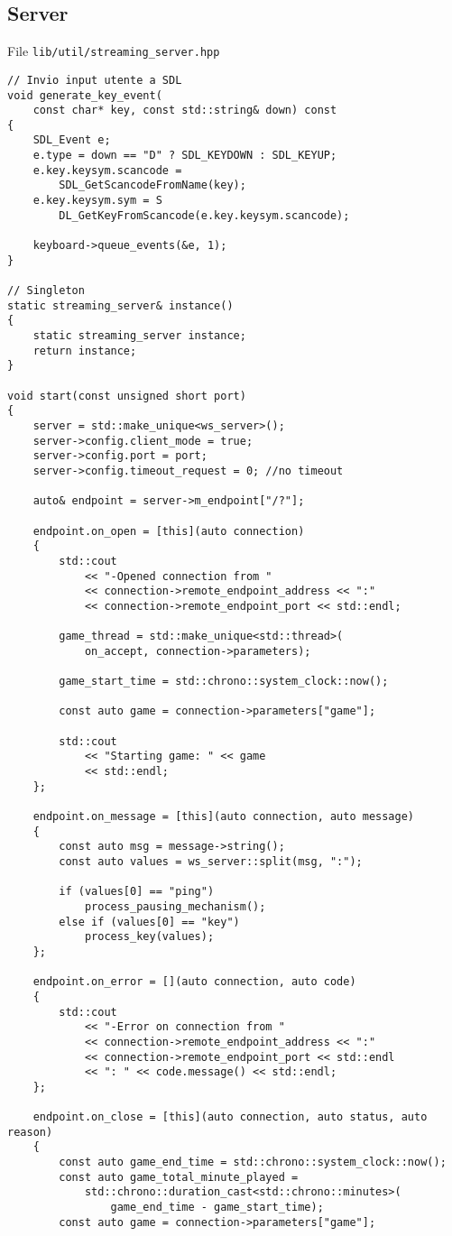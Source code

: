 \subsection{Server}
File \verb|lib/util/streaming_server.hpp|

\begin{verbatim}
// Invio input utente a SDL
void generate_key_event(
	const char* key, const std::string& down) const
{
	SDL_Event e;
	e.type = down == "D" ? SDL_KEYDOWN : SDL_KEYUP;
	e.key.keysym.scancode = 
		SDL_GetScancodeFromName(key);
	e.key.keysym.sym = S
		DL_GetKeyFromScancode(e.key.keysym.scancode);

	keyboard->queue_events(&e, 1);
}

// Singleton
static streaming_server& instance()
{
	static streaming_server instance;
	return instance;
}

void start(const unsigned short port)
{
	server = std::make_unique<ws_server>();
	server->config.client_mode = true;
	server->config.port = port;
	server->config.timeout_request = 0; //no timeout

	auto& endpoint = server->m_endpoint["/?"];

	endpoint.on_open = [this](auto connection)
	{
		std::cout
			<< "-Opened connection from "
			<< connection->remote_endpoint_address << ":"
			<< connection->remote_endpoint_port	<< std::endl;

		game_thread = std::make_unique<std::thread>(
			on_accept, connection->parameters);

		game_start_time = std::chrono::system_clock::now();

		const auto game = connection->parameters["game"];

		std::cout
			<< "Starting game: " << game
			<< std::endl;
	};

	endpoint.on_message = [this](auto connection, auto message)
	{
		const auto msg = message->string();
		const auto values = ws_server::split(msg, ":");

		if (values[0] == "ping")
			process_pausing_mechanism();
		else if (values[0] == "key")
			process_key(values);
	};

	endpoint.on_error = [](auto connection, auto code)
	{
		std::cout
			<< "-Error on connection from "
			<< connection->remote_endpoint_address << ":"
			<< connection->remote_endpoint_port	<< std::endl
			<< ": " << code.message() << std::endl;
	};

	endpoint.on_close = [this](auto connection, auto status, auto reason)
	{
		const auto game_end_time = std::chrono::system_clock::now();
		const auto game_total_minute_played = 
			std::chrono::duration_cast<std::chrono::minutes>(
				game_end_time - game_start_time);
		const auto game = connection->parameters["game"];


\end{verbatim}
